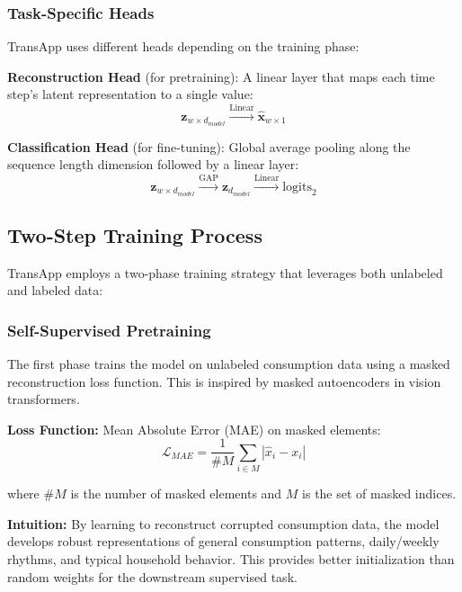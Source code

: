 \documentclass[conference]{IEEEtran}
\begin{document}
\subsubsection{Task-Specific Heads}

TransApp uses different heads depending on the training phase:

\textbf{Reconstruction Head} (for pretraining): A linear layer that maps each time step's latent representation to a single value:
\begin{equation}
\mathbf{z}_{w \times d_{model}} \xrightarrow{\text{Linear}} \hat{\mathbf{x}}_{w \times 1}
\end{equation}

\textbf{Classification Head} (for fine-tuning): Global average pooling along the sequence length dimension followed by a linear layer:
\begin{equation}
\mathbf{z}_{w \times d_{model}} \xrightarrow{\text{GAP}} \mathbf{z}_{d_{model}} \xrightarrow{\text{Linear}} \text{logits}_2
\end{equation}

\subsection{Two-Step Training Process}

TransApp employs a two-phase training strategy that leverages both unlabeled and labeled data:

\subsubsection{Self-Supervised Pretraining}

The first phase trains the model on unlabeled consumption data using a masked reconstruction loss function. This is inspired by masked autoencoders in vision transformers.

\textbf{Loss Function:} Mean Absolute Error (MAE) on masked elements:
\begin{equation}
\mathcal{L}_{MAE} = \frac{1}{\#M} \sum_{i \in M} |\hat{x}_i - x_i|
\end{equation}

where $\#M$ is the number of masked elements and $M$ is the set of masked indices.

\textbf{Intuition:} By learning to reconstruct corrupted consumption data, the model develops robust representations of general consumption patterns, daily/weekly rhythms, and typical household behavior. This provides better initialization than random weights for the downstream supervised task.
\end{document}
